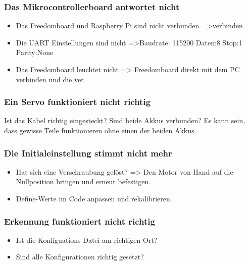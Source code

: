 \subsubsection{Das Mikrocontrollerboard antwortet nicht}
\begin{itemize}
\item Das Freedomboard und Raspberry Pi sind nicht verbunden =>verbinden
\item Die UART Einstellungen sind nicht =>Baudrate: 115200 Daten:8 Stop:1 Parity:None
\item Das Freedomboard leuchtet nicht => Freedomboard direkt mit dem PC verbinden und die ver

\end{itemize}
\subsubsection{Ein Servo funktioniert nicht richtig}
Ist das Kabel richtig eingesteckt?
Sind beide Akkus verbunden? Es kann sein, dass gewisse Teile funktionieren ohne einen der beiden Akkus.
\subsubsection{Die Initialeinstellung stimmt nicht mehr}
\begin{itemize}
\item Hat sich eine Verschraubung gelöst? => Den Motor von Hand auf die Nullposition bringen und erneut befestigen.
\item Define-Werte im Code anpassen und rekalibrieren.
\end{itemize}
\subsubsection{Erkennung funktioniert nicht richtig}
\begin{itemize}
\item Ist die Konfiguations-Datei am richtigen Ort?
\item Sind alle Konfigurationen richtig gesetzt?
\end{itemize}

